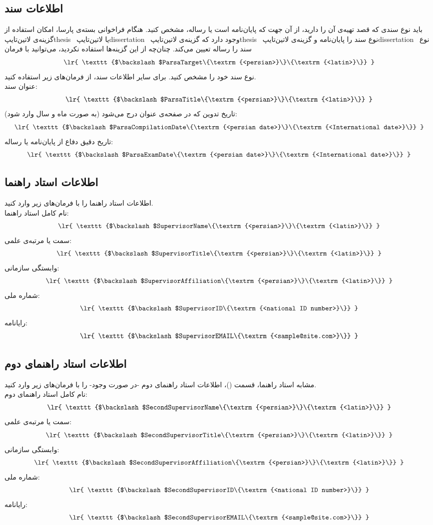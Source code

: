 \documentclass[12pt,a4paper,twoside,fleqn,notitlepage,openany]{extbook}
\begin{document}
\subsection{اطلاعات سند} \label{ParsaInf}
باید نوع سندی که قصد تهیه‌‌ی آن را دارید، از آن جهت که پایان‌نامه است یا رساله، مشخص کنید\@. هنگام فراخوانی بسته‌ی پارسا، امکان استفاده از گزینه‌ی ‌لاتین{‌تایپ{thesis}} ~یا ‌لاتین{‌تایپ{dissertation}} ~وجود دارد که گزینه‌ی ‌لاتین{‌تایپ{thesis}} ~نوع سند را پایان‌نامه و گزینه‌ی ‌لاتین{‌تایپ{dissertation}} ~نوع سند را رساله تعیین می‌کند. چنان‌چه از این گزینه‌ها استفاده نکردید، می‌توانید با فرمان
\[ \textrm{ \lr{ \texttt{$\backslash$ParsaTarget\{\textrm{<persian>}\}\{\textrm{<latin>}\}} } } \]
نوع سند خود را مشخص کنید\@. برای سایر اطلاعات سند، از فرمان‌های زیر استفاده کنید\@. \\
عنوان سند:
\[ \textrm{ \lr{ \texttt{$\backslash$ParsaTitle\{\textrm{<persian>}\}\{\textrm{<latin>}\}} } } \]
تاریخ تدوین که در صفحه‌ی عنوان درج می‌شود (به صورت ماه و سال وارد شود):
\[ \textrm{ \lr{ \texttt{$\backslash$ParsaCompilationDate\{\textrm{<persian date>}\}\{\textrm{<International date>}\}} } } \]
تاریخ دقیق دفاع از پایان‌نامه یا رساله:
\[ \textrm{ \lr{ \texttt{$\backslash$ParsaExamDate\{\textrm{<persian date>}\}\{\textrm{<International date>}\}} } } \]
\subsection{اطلاعات استاد راهنما} \label{SupInf}
اطلاعات استاد راهنما را با فرمان‌های زیر وارد کنید\@. \\
نام کامل استاد راهنما:
\[ \textrm{ \lr{ \texttt{$\backslash$SupervisorName\{\textrm{<persian>}\}\{\textrm{<latin>}\}} } } \]
سمت یا مرتبه‌ی علمی:
\[ \textrm{ \lr{ \texttt{$\backslash$SupervisorTitle\{\textrm{<persian>}\}\{\textrm{<latin>}\}} } } \]
وابستگی سازمانی:
\[ \textrm{ \lr{ \texttt{$\backslash$SupervisorAffiliation\{\textrm{<persian>}\}\{\textrm{<latin>}\}} } } \]
شماره ملی:
\[ \textrm{ \lr{ \texttt{$\backslash$SupervisorID\{\textrm{<national ID number>}\}} } } \]
رایانامه:
\[ \textrm{ \lr{ \texttt{$\backslash$SupervisorEMAIL\{\textrm{<sample@site.com>}\}} } } \]
\subsection{اطلاعات استاد راهنمای دوم}
مشابه استاد راهنما، قسمت ()، اطلاعات استاد راهنمای دوم -در صورت وجود- را با فرمان‌های زیر وارد کنید\@. \\
نام کامل استاد راهنمای دوم:
\[ \textrm{ \lr{ \texttt{$\backslash$SecondSupervisorName\{\textrm{<persian>}\}\{\textrm{<latin>}\}} } } \]
سمت یا مرتبه‌ی علمی:
\[ \textrm{ \lr{ \texttt{$\backslash$SecondSupervisorTitle\{\textrm{<persian>}\}\{\textrm{<latin>}\}} } } \]
وابستگی سازمانی:
\[ \textrm{ \lr{ \texttt{$\backslash$SecondSupervisorAffiliation\{\textrm{<persian>}\}\{\textrm{<latin>}\}} } } \]
شماره ملی:
\[ \textrm{ \lr{ \texttt{$\backslash$SecondSupervisorID\{\textrm{<national ID number>}\}} } } \]
رایانامه:
\[ \textrm{ \lr{ \texttt{$\backslash$SecondSupervisorEMAIL\{\textrm{<sample@site.com>}\}} } } \]
\end{document}
